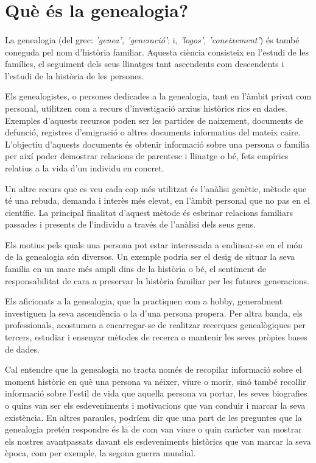 \section{Què és la genealogia?}

    \paragraph{}
    La \gls{genealogia} (del grec:  \emph{'genea', 'generació'}; i, \emph{'logos', 'coneixement'}) és també coneguda pel nom d’història familiar. Aquesta ciència consisteix en l’estudi de les famílies, el seguiment dels seus llinatges tant ascendents com descendents i l’estudi de la història de les persones.

    Els genealogistes, o persones dedicades a la genealogia, tant en l’àmbit privat com personal, utilitzen com a recurs d’investigació arxius històrics rics en dades. Exemples d'aquests recursos poden ser les partides de naixement, documents de defunció, registres d’emigració o altres documents informatius del mateix caire.  L'objectiu d'aquests documents és obtenir informació sobre una persona o família per així poder demostrar relacions de parentesc i llinatge o bé, fets empírics relatius a la vida d'un individu en concret.

    Un altre recurs que es veu cada cop més utilitzat és l'anàlisi genètic, mètode que té una rebuda, demanda i interès més elevat, en l’àmbit personal que no pas en el científic. La principal finalitat d'aquest mètode és esbrinar relacions familiars passades i presents de l'individu a través de l'anàlisi dels seus gens.

    Els motius pels quals una persona pot estar interessada a endinsar-se en el món de la genealogia són diversos. Un exemple podria ser el desig de situar la seva família en un marc més ampli dins de la història o bé, el sentiment de responsabilitat de cara a preservar la història familiar per les futures generacions.

    Els aficionats a la genealogia, que la practiquen com a hobby, generalment investiguen la seva ascendència o la d’una persona propera. Per altra banda, els pro\-fe\-ssio\-nals, acostumen a encarregar-se de realitzar recerques genealògiques per tercers, estudiar i ensenyar mètodes de recerca o mantenir les seves pròpies bases de dades.

    Cal entendre que la genealogia no tracta només de recopilar informació sobre el moment històric en què una persona va néixer, viure o morir, sinó també recollir informació sobre l'estil de vida que aquella persona va portar, les seves biografies o quins van ser els esdeveniments i motivacions que van conduir i marcar la seva existència. En altres paraules, podríem dir que una part de les preguntes que la genealogia pretén respondre és la de com van viure o quin caràcter van mostrar els nostres avantpassats davant els esdeveniments històrics que van marcar la seva època, com per exemple, la segona guerra mundial.

